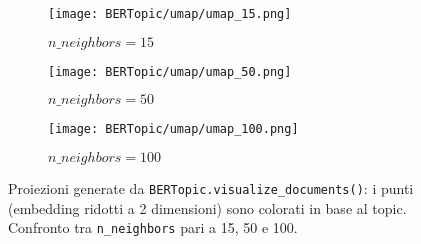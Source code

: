 \begin{figure}[H]
\centering
\begin{subfigure}{0.32\textwidth}
    \centering
    \texttt{[image: BERTopic/umap/umap\_15.png]}
    \caption{$n\_neighbors = 15$}
\end{subfigure}\hfill
\begin{subfigure}{0.32\textwidth}
    \centering
    \texttt{[image: BERTopic/umap/umap\_50.png]}
    \caption{$n\_neighbors = 50$}
\end{subfigure}\hfill
\begin{subfigure}{0.32\textwidth}
    \centering
    \texttt{[image: BERTopic/umap/umap\_100.png]}
    \caption{$n\_neighbors = 100$}
\end{subfigure}
\caption{Proiezioni generate da \texttt{BERTopic.\allowbreak visualize\_documents()}: i punti (embedding ridotti a 2 dimensioni) sono colorati in base al topic. Confronto tra \texttt{n\_neighbors} pari a 15, 50 e 100.}
\label{fig:umap-neighbors-comparison}
\end{figure}


